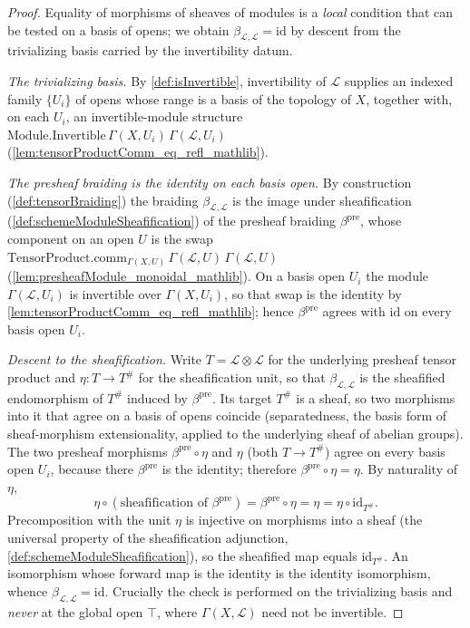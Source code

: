 \begin{proof}
  \leanok
  Equality of morphisms of sheaves of modules is a \emph{local} condition that can
  be tested on a basis of opens; we obtain
  \(\beta_{\mathcal{L},\mathcal{L}} = \mathrm{id}\) by descent from the trivializing
  basis carried by the invertibility datum.

  \emph{The trivializing basis.} By \cref{def:isInvertible}, invertibility of
  \(\mathcal{L}\) supplies an indexed family \(\{U_i\}\) of opens whose range is a
  basis of the topology of \(X\), together with, on each \(U_i\), an
  invertible-module structure
  \(\mathrm{Module.Invertible}\,\Gamma(X,U_i)\,\Gamma(\mathcal{L},U_i)\)
  (\cref{lem:tensorProductComm_eq_refl_mathlib}).

  \emph{The presheaf braiding is the identity on each basis open.} By construction
  (\cref{def:tensorBraiding}) the braiding \(\beta_{\mathcal{L},\mathcal{L}}\) is
  the image under sheafification (\cref{def:schemeModuleSheafification}) of the
  presheaf braiding \(\beta^{\mathrm{pre}}\), whose component on an open \(U\) is the
  swap \(\mathrm{TensorProduct.comm}_{\Gamma(X,U)}\,\Gamma(\mathcal{L},U)\,
  \Gamma(\mathcal{L},U)\) (\cref{lem:presheafModule_monoidal_mathlib}). On a basis
  open \(U_i\) the module \(\Gamma(\mathcal{L},U_i)\) is invertible over
  \(\Gamma(X,U_i)\), so that swap is the identity by
  \cref{lem:tensorProductComm_eq_refl_mathlib}; hence \(\beta^{\mathrm{pre}}\)
  agrees with \(\mathrm{id}\) on every basis open \(U_i\).

  \emph{Descent to the sheafification.} Write \(T = \mathcal{L} \otimes
  \mathcal{L}\) for the underlying presheaf tensor product and
  \(\eta : T \to T^{\#}\) for the sheafification unit, so that
  \(\beta_{\mathcal{L},\mathcal{L}}\) is the sheafified endomorphism of \(T^{\#}\)
  induced by \(\beta^{\mathrm{pre}}\). Its target \(T^{\#}\) is a sheaf, so two
  morphisms into it that agree on a basis of opens coincide (separatedness, the
  basis form of sheaf-morphism extensionality, applied to the underlying sheaf of
  abelian groups). The two presheaf morphisms
  \(\beta^{\mathrm{pre}} \circ \eta\) and \(\eta\) (both \(T \to T^{\#}\)) agree on
  every basis open \(U_i\), because there \(\beta^{\mathrm{pre}}\) is the identity;
  therefore \(\beta^{\mathrm{pre}} \circ \eta = \eta\). By naturality of \(\eta\),
  \[
    \eta \circ (\text{sheafification of } \beta^{\mathrm{pre}})
      = \beta^{\mathrm{pre}} \circ \eta = \eta = \eta \circ \mathrm{id}_{T^{\#}}.
  \]
  Precomposition with the unit \(\eta\) is injective on morphisms into a sheaf (the
  universal property of the sheafification adjunction,
  \cref{def:schemeModuleSheafification}), so the sheafified map equals
  \(\mathrm{id}_{T^{\#}}\). An isomorphism whose forward map is the identity is the
  identity isomorphism, whence \(\beta_{\mathcal{L},\mathcal{L}} = \mathrm{id}\).
  Crucially the check is performed on the trivializing basis and \emph{never} at the
  global open \(\top\), where \(\Gamma(X,\mathcal{L})\) need not be invertible.


\end{proof}
